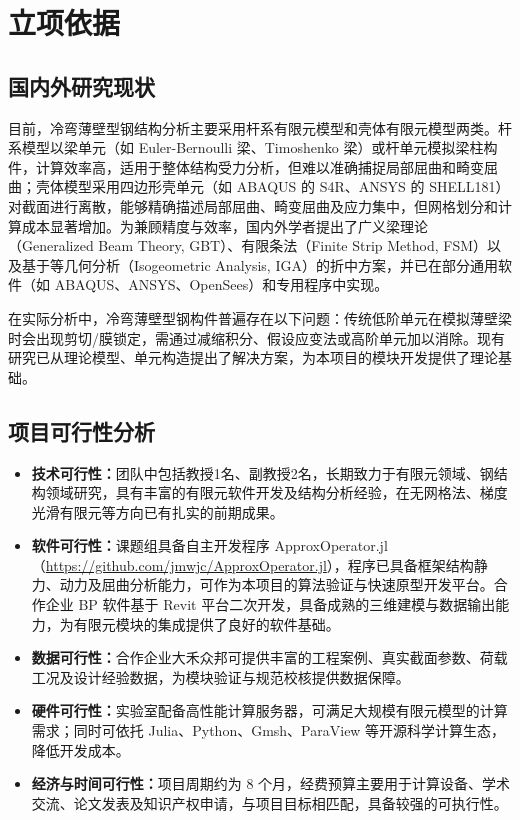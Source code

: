 \section{立项依据}
\subsection{国内外研究现状}

目前，冷弯薄壁型钢结构分析主要采用杆系有限元模型和壳体有限元模型两类\cite{Bathe1996, Belytschko2013}。杆系模型以梁单元（如 Euler-Bernoulli 梁、Timoshenko 梁）或杆单元模拟梁柱构件，计算效率高，适用于整体结构受力分析，但难以准确捕捉局部屈曲和畸变屈曲；壳体模型采用四边形壳单元（如 ABAQUS 的 S4R、ANSYS 的 SHELL181）对截面进行离散，能够精确描述局部屈曲、畸变屈曲及应力集中，但网格划分和计算成本显著增加。为兼顾精度与效率，国内外学者提出了广义梁理论（Generalized Beam Theory, GBT）、有限条法（Finite Strip Method, FSM）以及基于等几何分析（Isogeometric Analysis, IGA）的折中方案\cite{Schafer2008, wu2018}，并已在部分通用软件（如 ABAQUS、ANSYS、OpenSees）和专用程序中实现。

在实际分析中，冷弯薄壁型钢构件普遍存在以下问题：传统低阶单元在模拟薄壁梁时会出现剪切/膜锁定，需通过减缩积分、假设应变法或高阶单元加以消除\cite{wu2021, wang2019}。现有研究已从理论模型、单元构造提出了解决方案，为本项目的模块开发提供了理论基础。

\subsection{项目可行性分析}
\begin{itemize}[leftmargin=2em]
    \item \textbf{技术可行性：}团队中包括教授1名、副教授2名，长期致力于有限元领域、钢结构领域研究，具有丰富的有限元软件开发及结构分析经验，在无网格法、梯度光滑有限元等方向已有扎实的前期成果\cite{wu2020, wu2023, wang2018, du2022}。
    \item \textbf{软件可行性：}课题组具备自主开发程序 ApproxOperator.jl（\url{https://github.com/jmwjc/ApproxOperator.jl}）\cite{wang2019, wu2023}，程序已具备框架结构静力、动力及屈曲分析能力，可作为本项目的算法验证与快速原型开发平台。合作企业 BP 软件基于 Revit 平台二次开发，具备成熟的三维建模与数据输出能力，为有限元模块的集成提供了良好的软件基础。
    \item \textbf{数据可行性：}合作企业大禾众邦可提供丰富的工程案例、真实截面参数、荷载工况及设计经验数据，为模块验证与规范校核提供数据保障。
    \item \textbf{硬件可行性：}实验室配备高性能计算服务器，可满足大规模有限元模型的计算需求；同时可依托 Julia、Python、Gmsh、ParaView 等开源科学计算生态，降低开发成本。
    \item \textbf{经济与时间可行性：}项目周期约为 8 个月，经费预算主要用于计算设备、学术交流、论文发表及知识产权申请，与项目目标相匹配，具备较强的可执行性。
\end{itemize}